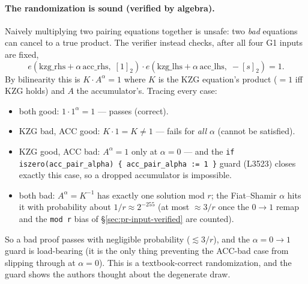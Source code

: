 \paragraph{The randomization is sound (verified by algebra).}
Naively multiplying two pairing equations together is unsafe: two
\emph{bad} equations can cancel to a true product. The verifier
instead checks, after all four G1 inputs are fixed,
\[
e(\text{kzg\_rhs} + \alpha\,\text{acc\_rhs},\; [1]_2)\cdot
e(\text{kzg\_lhs} + \alpha\,\text{acc\_lhs},\; -[s]_2) = 1 .
\]
By bilinearity this is $K \cdot A^{\alpha} = 1$ where $K$ is the
KZG equation's product ($=1$ iff KZG holds) and $A$ the
accumulator's. Tracing every case:
\begin{itemize}[leftmargin=1.4em,itemsep=2pt]
\item both good: $1\cdot 1^{\alpha}=1$ --- passes (correct).
\item KZG bad, ACC good: $K\cdot 1 = K \ne 1$ --- fails for
  \emph{all} $\alpha$ (cannot be satisfied).
\item KZG good, ACC bad: $A^{\alpha}=1$ only at $\alpha=0$ ---
  and the \texttt{if iszero(acc\_\allowbreak{}pair\_\allowbreak{}alpha) \{ acc\_\allowbreak{}pair\_\allowbreak{}alpha := 1 \}} guard
  (L3523) closes exactly this case, so a dropped accumulator is
  impossible.
\item both bad: $A^{\alpha}=K^{-1}$ has exactly one solution
  mod $r$; the Fiat--Shamir $\alpha$ hits it with probability
  about $1/r \approx 2^{-255}$ (at most $\approx 3/r$ once the
  $0{\to}1$ remap and the \texttt{mod r} bias of
  \S\ref{sec:pr-input-verified} are counted).
\end{itemize}
So a bad proof passes with negligible probability ($\lesssim 3/r$), and the
$\alpha{=}0{\to}1$ guard is load-bearing (it is the only thing
preventing the ACC-bad case from slipping through at $\alpha=0$).
This is a textbook-correct randomization, and the guard shows the
authors thought about the degenerate draw.

